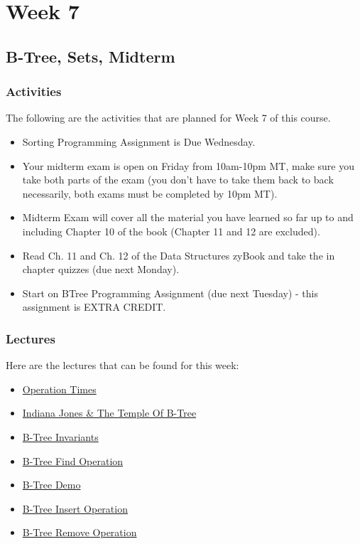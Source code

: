 \clearpage

\chapter{Week 7}

\section{B-Tree, Sets, Midterm}

\horizontalline

\subsection{Activities}

The following are the activities that are planned for Week 7 of this course.

\begin{itemize}
    \item Sorting Programming Assignment is Due Wednesday.
    \item Your midterm exam is open on Friday from 10am-10pm MT, make sure you take both parts of the exam (you don't have to take them back to back necessarily, both exams must be completed by 10pm MT).
    \item Midterm Exam will cover all the material you have learned so far up to and including Chapter 10 of the book (Chapter 11 and 12 are excluded).
    \item Read Ch. 11 and Ch. 12 of the Data Structures zyBook and take the in chapter quizzes (due next Monday).
    \item Start on BTree Programming Assignment (due next Tuesday) - this assignment is EXTRA CREDIT.
\end{itemize}

\subsection{Lectures}

Here are the lectures that can be found for this week:

\begin{itemize}
    \item \href{https://applied.cs.colorado.edu/mod/hvp/view.php?id=45970}{Operation Times}
    \item \href{https://applied.cs.colorado.edu/mod/hvp/view.php?id=45971}{Indiana Jones \& The Temple Of B-Tree}
    \item \href{https://applied.cs.colorado.edu/mod/hvp/view.php?id=45972}{B-Tree Invariants}
    \item \href{https://applied.cs.colorado.edu/mod/hvp/view.php?id=45973}{B-Tree Find Operation}
    \item \href{https://applied.cs.colorado.edu/mod/hvp/view.php?id=45974}{B-Tree Demo}
    \item \href{https://applied.cs.colorado.edu/mod/hvp/view.php?id=45975}{B-Tree Insert Operation}
    \item \href{https://applied.cs.colorado.edu/mod/hvp/view.php?id=45976}{B-Tree Remove Operation}
\end{itemize}

